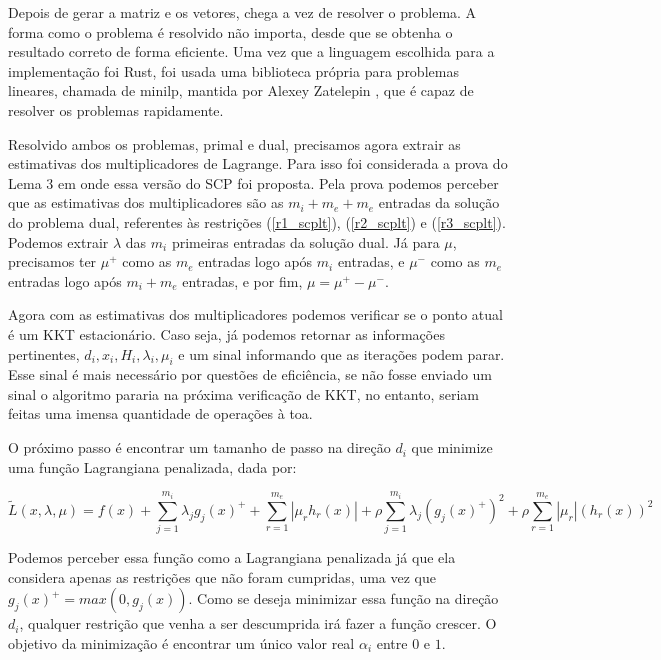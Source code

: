 Depois de gerar a matriz e os vetores, chega a vez de resolver o problema. A forma
como o problema é resolvido não importa, desde que se obtenha o resultado correto
de forma eficiente. Uma vez que a linguagem escolhida para a implementação foi Rust,
foi usada uma biblioteca própria para problemas lineares, chamada de minilp, mantida
por Alexey Zatelepin \cite{minilp}, que é capaz de resolver os problemas rapidamente.

Resolvido ambos os problemas, primal e dual, precisamos agora extrair as estimativas
dos multiplicadores de Lagrange. Para isso foi considerada a prova do Lema 3 em \cite{Still2010}
onde essa versão do SCP foi proposta. Pela prova podemos perceber que as estimativas dos
multiplicadores são as \(m_i + m_e + m_e\) entradas da solução do problema dual, referentes
às restrições (\ref{r1_scplt}), (\ref{r2_scplt}) e (\ref{r3_scplt}). Podemos extrair
\(\lambda\) das \(m_i\) primeiras entradas da solução dual. Já para \(\mu\), precisamos
ter \(\mu^+\) como as \(m_e\) entradas logo após \(m_i\) entradas, e  \(\mu^-\) como as
\(m_e\) entradas logo após \(m_i+m_e\) entradas, e por fim, \(\mu = \mu^+ - \mu^-\).

Agora com as estimativas dos multiplicadores podemos verificar se o ponto atual é
um KKT estacionário. Caso seja, já podemos retornar as informações pertinentes,
\(d_i, x_i, H_i, \lambda_i, \mu_i\) e um sinal informando que as iterações podem
parar. Esse sinal é mais necessário por questões de eficiência, se não fosse
enviado um sinal o algoritmo pararia na próxima verificação de KKT, no entanto,
seriam feitas uma imensa quantidade de operações à toa.

O próximo passo é encontrar um tamanho de passo na direção \(d_i\) que minimize
uma função Lagrangiana penalizada, dada por:

{\footnotesize
\begin{equation}
  \label{scp_langrangiana_penalizada}
  \widetilde{L}(x, \lambda, \mu) = f(x) + \sum_{j=1}^{m_i} \lambda_j g_j(x)^+ + \sum_{r=1}^{m_e}|\mu_rh_r(x)| + \rho \sum_{j=1}^{m_i} \lambda_j (g_j(x)^+)^2 + \rho  \sum_{r=1}^{m_e}|\mu_r|(h_r(x))^2
\end{equation}
}

Podemos perceber essa função como a Lagrangiana penalizada já que ela considera apenas as
restrições que não foram cumpridas, uma vez que \(g_j(x)^+ = max(0, g_j(x))\). Como se
deseja minimizar essa função na direção \(d_i\), qualquer restrição que venha a ser
descumprida irá fazer a função crescer. O objetivo da minimização é encontrar um
único valor real \(\alpha_i\) entre \(0\) e \(1\).


